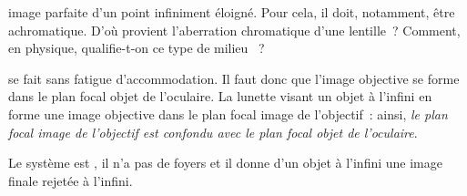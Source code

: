 \documentclass[a4paper, 10pt, garamond, oneside]{book}
\begin{document}
{\begin{enumerate}
		      image parfaite d'un point infiniment éloigné. Pour cela, il doit,
		      notamment, être achromatique. D'où provient l'aberration chromatique
		      d'une lentille~? Comment, en physique, qualifie-t-on ce type de milieu
		      ~?
	\end{enumerate}
}{
	\begin{enumerate}
      se fait sans fatigue
		      d'accommodation. Il faut donc que l'image objective se forme dans le
		      plan focal objet de l'oculaire. La lunette visant un objet à l'infini
		      en forme une image objective dans le plan focal image de l'objectif~:
		      ainsi, \emph{le plan focal image de l'objectif est confondu avec le
			      plan focal objet de l'oculaire}.

		      Le système est , il n'a pas de foyers et il donne
		      d'un objet à l'infini une image finale rejetée à l'infini.


\end{enumerate}}
\end{document}
